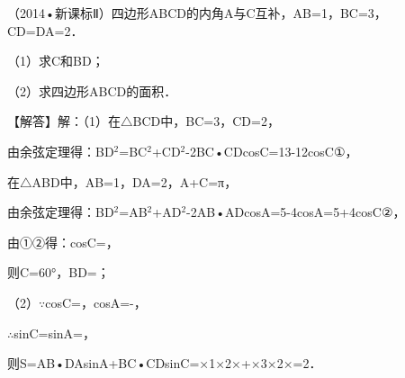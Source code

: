 \begin{question}
（2014•新课标Ⅱ）四边形ABCD的内角A与C互补，AB=1，BC=3，CD=DA=2．\par
（1）求C和BD；\par
（2）求四边形ABCD的面积．\par
\begin{solution}
【解答】解：（1）在$\triangle$BCD中，BC=3，CD=2，\par
由余弦定理得：BD$^{2}$=BC$^{2}$+CD$^{2}$-2BC•CDcosC=13-12cosC①，\par
在$\triangle$ABD中，AB=1，DA=2，A+C=π，\par
由余弦定理得：BD$^{2}$=AB$^{2}$+AD$^{2}$-2AB•ADcosA=5-4cosA=5+4cosC②，\par
由①②得：cosC=\allowbreak{}，\par
则C=60°，BD=\allowbreak{}；\par
（2）$\because$cosC=\allowbreak{}，cosA=-\allowbreak{}，\par
$\therefore$sinC=sinA=\allowbreak{}，\par
则S=\allowbreak{}AB•DAsinA+\allowbreak{}BC•CDsinC=\allowbreak{}×1×2×\allowbreak{}+\allowbreak{}×3×2×\allowbreak{}=2\allowbreak{}．\par
\begin{center}
\allowbreak{}
\end{center}
\end{solution}
\end{question}

